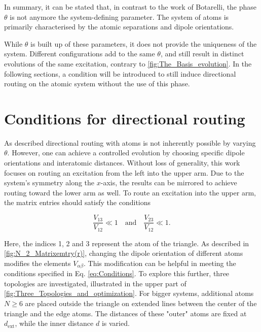 \noindent
In summary, it can be stated that, in contrast to the work of Botarelli, the phase $ \theta $ is not anymore the system-defining parameter.
The system of atoms is primarily characterised by the atomic separations and dipole orientations.

\noindent
While $ \theta $ is built up of these parameters, it does not provide the uniqueness of the system.
Different configurations add to the same $ \theta $,
and still result in distinct evolutions of the same excitation, contrary to \autoref{fig:The_Basis_evolution}.
In the following sections,
a condition will be introduced to still induce directional routing on the atomic system without the use of this phase.


\section{Conditions for directional routing}\label{sec:solutions}
As described directional routing with atoms is not inherently possible by varying $\theta$.
However, one can achieve a controlled evolution by choosing specific dipole orientations and interatomic distances.
Without loss of generality, this work focuses on routing an excitation from the left into the upper arm.
Due to the system's symmetry along the $x$-axis, the results can be mirrored to achieve routing toward the lower arm as well.
To route an excitation into the upper arm, the matrix entries should satisfy the conditions

\begin{equation} \label{eq:Conditions}
\frac{V_{13}}{V_{12}} \ll 1 \quad \text{and} \quad \frac{V_{23}}{V_{12}} \ll 1 \text{.}
\end{equation}

\noindent
Here, the indices 1, 2 and 3 represent the atom of the triangle.
As described in \autoref{fig:N_2_Matrixemtry(r)}, changing the dipole orientation of different atoms modifies the elements $V_{\alpha \beta}$.
This modification can be helpful in meeting the conditions specified in Eq. \eqref{eq:Conditions}.
To explore this further, three topologies are investigated, illustrated in the upper part of \autoref{fig:Three_Topologies_and_optimization}.
For bigger systems,
additional atoms $N \geq 6$ are placed outside the triangle on extended lines between the center of the triangle
and the edge atoms.
The distances of these "outer" atoms are fixed at $d_\text{ext}$,
while the inner distance $d$ is varied.

